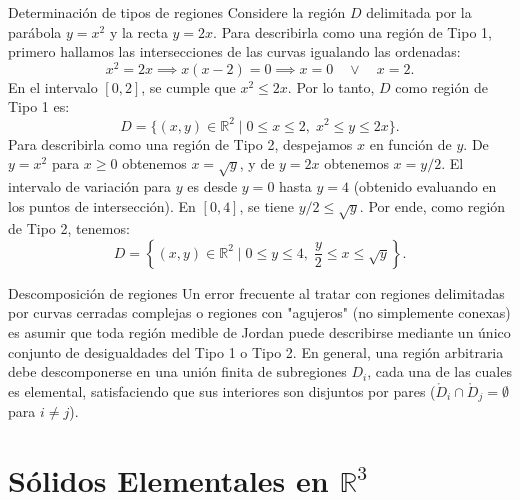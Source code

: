 \documentclass[11pt,a4paper]{article}
\begin{document}
\begin{ejemplobox}{Determinación de tipos de regiones}
Considere la región $D$ delimitada por la parábola $y = x^2$ y la recta $y = 2x$.
Para describirla como una región de Tipo 1, primero hallamos las intersecciones de las curvas igualando las ordenadas:
\[
x^2 = 2x \implies x(x-2) = 0 \implies x = 0 \quad \lor \quad x = 2.
\]
En el intervalo $[0, 2]$, se cumple que $x^2 \leq 2x$. Por lo tanto, $D$ como región de Tipo 1 es:
\[
D = \{ (x,y) \in \mathbb{R}^2 \mid 0 \leq x \leq 2, \; x^2 \leq y \leq 2x \}.
\]
Para describirla como una región de Tipo 2, despejamos $x$ en función de $y$. De $y = x^2$ para $x \geq 0$ obtenemos $x = \sqrt{y}$, y de $y = 2x$ obtenemos $x = y/2$. El intervalo de variación para $y$ es desde $y=0$ hasta $y=4$ (obtenido evaluando en los puntos de intersección). En $[0, 4]$, se tiene $y/2 \leq \sqrt{y}$. Por ende, como región de Tipo 2, tenemos:
\[
D = \left\{ (x,y) \in \mathbb{R}^2 \mid 0 \leq y \leq 4, \; \frac{y}{2} \leq x \leq \sqrt{y} \right\}.
\]
\begin{center}
\end{center}
\end{ejemplobox}

\begin{errorbox}{Descomposición de regiones}
Un error frecuente al tratar con regiones delimitadas por curvas cerradas complejas o regiones con "agujeros" (no simplemente conexas) es asumir que toda región medible de Jordan puede describirse mediante un único conjunto de desigualdades del Tipo 1 o Tipo 2. 
En general, una región arbitraria debe descomponerse en una unión finita de subregiones $D_i$, cada una de las cuales es elemental, satisfaciendo que sus interiores son disjuntos por pares ($\mathring{D}_i \cap \mathring{D}_j = \emptyset$ para $i \neq j$).
\end{errorbox}

\section{Sólidos Elementales en $\mathbb{R}^3$}
\end{document}
